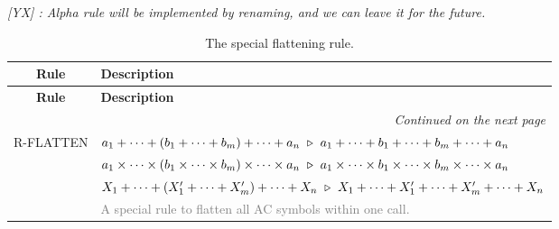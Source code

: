 \documentclass{article}
\newcommand{\yx}[1]{\textit{\color{blue}[YX] : #1}}
\begin{document}
\yx{Alpha rule will be implemented by renaming, and we can leave it for the future.}

\newenvironment{ruletable}[1]
{
    \begin{longtable}{cl}
    \caption{#1}\\
    \hline
    \textbf{Rule} & \textbf{Description} \\
    \hline
    \endfirsthead

    \hline
    \textbf{Rule} & \textbf{Description} \\
    \hline
    \endhead

    \hline
    \multicolumn{2}{r}{\textit{Continued on the next page}} \\
    \hline
    \endfoot

    \hline
    \endlastfoot
}
{
    \end{longtable}
}

\renewcommand{\arraystretch}{1.2} %

\begin{ruletable}{The special flattening rule.}
    R-FLATTEN
    & $a_1 + \cdots + (b_1 + \cdots + b_m) + \cdots + a_n\ \triangleright\ a_1 + \cdots + b_1 + \cdots + b_m + \cdots + a_n$ \\
    & $a_1 \times \cdots \times (b_1 \times \cdots \times b_m) \times \cdots \times a_n\ \reduce\ a_1 \times \cdots \times b_1 \times \cdots \times b_m \times \cdots \times a_n$ \\
    & $X_1 + \cdots + (X_1' + \cdots + X_m') + \cdots + X_n\ \triangleright\ X_1 + \cdots + X_1' + \cdots + X_m' + \cdots + X_n$ \\
    & \textcolor{gray}{A special rule to flatten all AC symbols within one call.}    
\end{ruletable}
\end{document}
